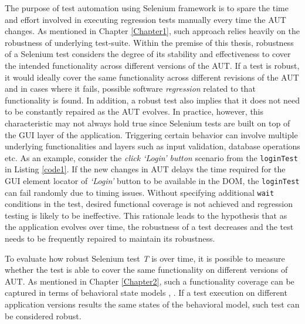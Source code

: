 The purpose of test automation using Selenium framework is to spare the time and effort involved in executing regression tests manually every time the AUT changes. As mentioned in Chapter \ref{Chapter1}, such approach relies heavily on the robustness of underlying test-suite. Within the premise of this thesis, robustness of a Selenium test considers the degree of its stability and effectiveness to cover the intended functionality across different versions of the AUT. If a test is robust, it would ideally cover the same functionality across different revisions of the AUT and in cases where it fails, possible software \textit{regression} related to that functionality is found. In addition, a robust test also implies that it does not need to be constantly repaired as the AUT evolves. In practice, however, this characteristic may not always hold true since Selenium tests are built on top of the GUI layer of the application. Triggering certain behavior can involve multiple underlying functionalities and layers such as input validation, database operations etc.
As an example, consider the \textit{click `Login' button} scenario from the \texttt{loginTest} in Listing \ref{code1}. If the new changes in AUT delays the time required for the GUI element locator of \textit{`Login'} button to be available in the DOM, the \texttt{loginTest} can fail randomly due to timing issues. Without specifying additional \texttt{wait} conditions in the test, desired functional coverage is not achieved and regression testing is likely to be ineffective. This rationale leads to the hypothesis that as the application evolves over time, the robustness of a test decreases and the test needs to be frequently repaired to maintain its robustness.  


To evaluate how robust Selenium test \textit{T} is over time, it is possible to measure whether the test is able to cover the same functionality on different versions of AUT. As mentioned in Chapter \ref{Chapter2}, such a functionality coverage can be captured in terms of behavioral state models \cite{marchettoStateBased}, \cite{SchurMiningBehavModels}. If a test execution on different application versions results the same states of the behavioral model, such test can be considered robust.

